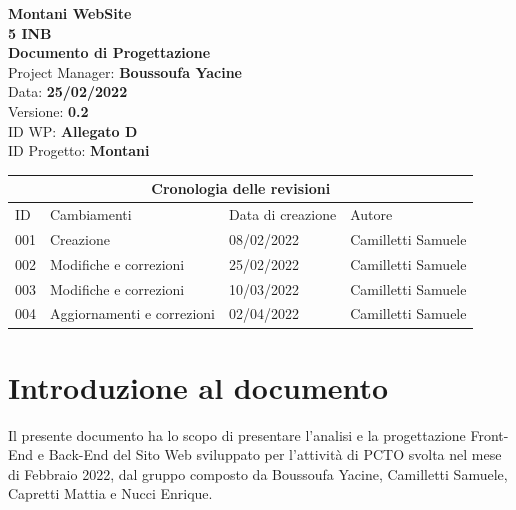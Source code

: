 \documentclass{article}
\begin{document}
	
	
	\begin{titlepage}
		\begin{center}
			\huge\textbf{Montani WebSite}\\
			\Large\textbf{5 INB}\\
			\Large \textbf{Documento di Progettazione}\\
			\vspace{4cm}
			\large Project Manager: \textbf{Boussoufa Yacine}\\
			\large Data: \textbf{25/02/2022}\\
			\large Versione: \textbf{0.2}\\
			\large ID WP: \textbf{Allegato D}\\
			\large ID Progetto: \textbf{Montani}\\
			
		\end{center}
	\end{titlepage}
	
	\clearpage
	
	\begin{tabular}{ |p{1cm}|p{4cm}|p{3cm}|p{2cm}|  }
		\hline
		\multicolumn{4}{|c|}{Cronologia delle revisioni} \\
		\hline
		ID& Cambiamenti &Data di creazione&Autore\\
		\hline
		001   & Creazione    &08/02/2022&   Camilletti Samuele\\
		\hline
		002   & Modifiche e correzioni    &25/02/2022&   Camilletti Samuele\\
		\hline
		003   & Modifiche e correzioni    &10/03/2022&   Camilletti Samuele\\
		\hline
004   & Aggiornamenti e correzioni    &02/04/2022&   Camilletti Samuele\\
\hline

	\end{tabular}
	
	\clearpage
	
	\tableofcontents
	\printindex	
	
   

	\section{\textbf{Introduzione al documento}}
	\flushleft
	\normalsize
	Il presente documento ha lo scopo di presentare l'analisi e la progettazione Front-End e Back-End del Sito Web sviluppato per l'attività di PCTO svolta nel mese di Febbraio 2022, dal gruppo composto da Boussoufa Yacine, Camilletti Samuele, Capretti Mattia e Nucci Enrique.
	\normalsize
\end{document}
